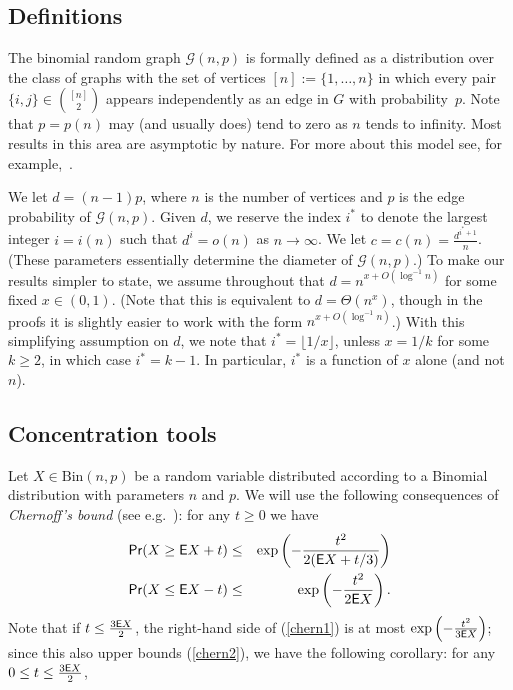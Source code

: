 \documentclass[12pt]{article}
\theoremstyle{definition}
\theoremstyle{remark}
\theoremstyle{remark}
\numberwithin{theorem}{section}
\newcommand{\E}{\textsf{\upshape E}}
\newcommand{\prob}{\textsf{\upshape Pr}}
\newcommand{\Gnp}{\mathcal{G}(n,p)}
\begin{document}
\subsection{Definitions}
The binomial random graph $\Gnp$ is formally defined as a distribution over the class of graphs with the set of vertices $[n]:=\{1,\ldots,n\}$ in which every pair $\{i,j\} \in \binom{[n]}{2}$ appears independently as an edge in $G$ with probability~$p$. Note that $p=p(n)$ may (and usually does) tend to zero as $n$ tends to infinity. Most results in this area are asymptotic by nature. For more about this model see, for example,~\cite{bollobas1998random,frieze2016introduction,JLR}. 

We let $d = (n-1)p$, where $n$ is the number of vertices and $p$ is the edge probability of $\Gnp$. Given $d$, we reserve the index $i^{*}$ to denote the largest integer $i = i(n)$ such that $d^{i} = o(n)$ as $n \to \infty$. We let $c = c(n) = \frac{d^{i^{*}+1}}{n}$. (These parameters essentially determine the diameter of $\Gnp$.) To make our results simpler to state, we assume throughout that $d = n^{x+O(\log^{-1}n)}$ for some fixed $x \in (0,1)$. (Note that this is equivalent to $d = \Theta(n^{x})$, though in the proofs it is slightly easier to work with the form $n^{x + O(\log^{-1}n)}$.) With this simplifying assumption on $d$, we note that $i^{*} = \lfloor 1/x \rfloor$, unless $x = 1/k$ for some $k \geq 2$, in which case $i^{*} = k-1$. In particular, $i^{*}$ is a function of $x$ alone (and not $n$).

\subsection{Concentration tools}
Let $X \in \textrm{Bin}(n,p)$ be a random variable distributed according to a Binomial distribution with parameters $n$ and $p$. We will use the following consequences of \emph{Chernoff's bound} (see e.g.~\cite[Theorem~2.1]{JLR}): for any $t \ge 0$ we have
	\begin{eqnarray}
		\prob( X \ge \E X + t ) &\le& \exp \left( - \frac {t^2}{2 (\E X + t/3)} \right)  \label{chern1} \\
		\prob( X \le \E X - t ) &\le& \exp \left( - \frac {t^2}{2 \E X} \right).\label{chern2}
	\end{eqnarray}
Note that if $t \leq \frac{3 \E X}{2}$, the right-hand side of (\ref{chern1}) is at most $\exp \left( - \frac {t^2}{3 \E X } \right)$; since this also upper bounds (\ref{chern2}), we have the following corollary: for any $0 \leq t \leq \frac{3 \E X}{2}$, 
\end{document}
